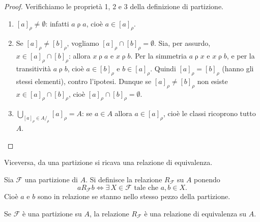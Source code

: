 \documentclass[11pt,a4paper]{article}
\begin{document}
\begin{proof}
Verifichiamo le proprietà 1, 2 e 3 della definizione di partizione.
\begin{enumerate}
    \item $[a]_\rho \neq \emptyset$: infatti $a \mathrel{\rho} a$, cioè
          $a \in [a]_\rho$.
    \item Se $[a]_\rho \neq [b]_\rho$, vogliamo $[a]_\rho \cap [b]_\rho =
          \emptyset$. Sia, per assurdo, $x \in [a]_\rho \cap [b]_\rho$:
          allora $x \mathrel{\rho} a$ e $x \mathrel{\rho} b$. Per la
          simmetria $a \mathrel{\rho} x$ e $x \mathrel{\rho} b$, e per la
          transitività $a \mathrel{\rho} b$, cioè $a \in [b]_\rho$ e
          $b \in [a]_\rho$. Quindi $[a]_\rho = [b]_\rho$ (hanno gli stessi
          elementi), contro l'ipotesi. Dunque se $[a]_\rho \neq
          [b]_\rho$ non esiste $x \in [a]_\rho \cap [b]_\rho$, cioè
          $[a]_\rho \cap [b]_\rho = \emptyset$.
    \item $\displaystyle \bigcup_{[a]_\rho \in A/_\rho} [a]_\rho = A$:
          se $a \in A$ allora $a \in [a]_\rho$, cioè le classi
          ricoprono tutto $A$. \qedhere
\end{enumerate}
\end{proof}

Viceversa, da una partizione si ricava una relazione di equivalenza.

\begin{definizione}
Sia $\mathcal{F}$ una partizione di $A$. Si definisce la relazione
$R_\mathcal{F}$ su $A$ ponendo
\[
a \mathrel{R_\mathcal{F}} b \iff \exists\, X \in \mathcal{F} \text{ tale
che } a, b \in X.
\]
Cioè $a$ e $b$ sono in relazione se stanno nello stesso pezzo della
partizione.
\end{definizione}

\begin{proposizione}[B]
Se $\mathcal{F}$ è una partizione su $A$, la relazione $R_\mathcal{F}$ è
una relazione di equivalenza su $A$.
\end{proposizione}
\end{document}
